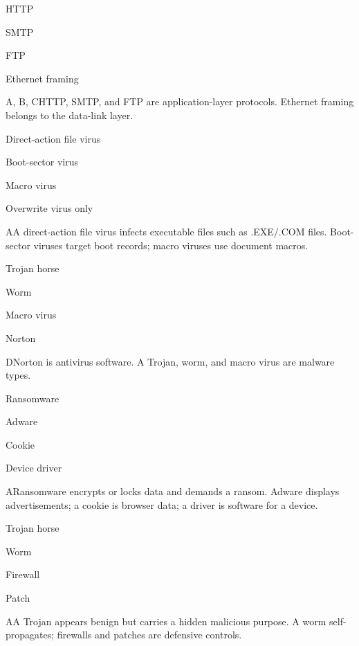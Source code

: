 \begin{enumerate}[label=\textbf{Q\arabic*.}, leftmargin=*]
  {\item HTTP
   \item SMTP
   \item FTP
   \item Ethernet framing}
  {A, B, C}{HTTP, SMTP, and FTP are application-layer protocols. Ethernet framing belongs to the data-link layer.}
\fi
\ifnum{}
  {\item Direct-action file virus
   \item Boot-sector virus
   \item Macro virus
   \item Overwrite virus only}
  {A}{A direct-action file virus infects executable files such as .EXE/.COM files. Boot-sector viruses target boot records; macro viruses use document macros.}
  {\item Trojan horse
   \item Worm
   \item Macro virus
   \item Norton}
  {D}{Norton is antivirus software. A Trojan, worm, and macro virus are malware types.}
  {\item Ransomware
   \item Adware
   \item Cookie
   \item Device driver}
  {A}{Ransomware encrypts or locks data and demands a ransom. Adware displays advertisements; a cookie is browser data; a driver is software for a device.}
  {\item Trojan horse
   \item Worm
   \item Firewall
   \item Patch}
  {A}{A Trojan appears benign but carries a hidden malicious purpose. A worm self-propagates; firewalls and patches are defensive controls.}

\end{enumerate}
